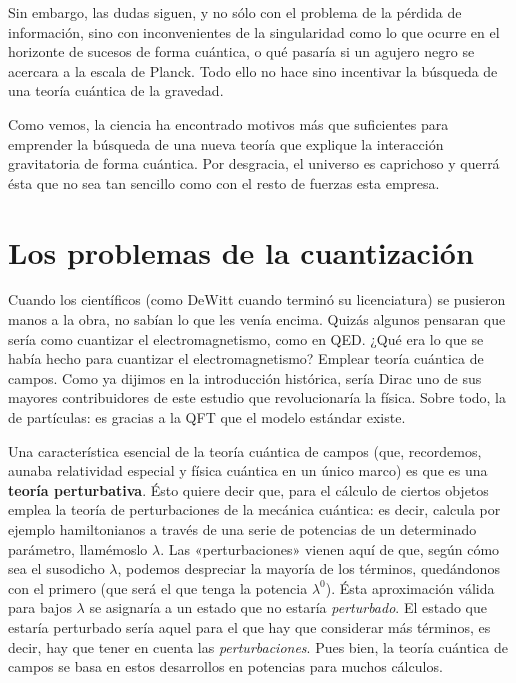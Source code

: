 \documentclass[11pt,a4paper,titlepage]{article}
\begin{document}
\begin{description}
{  Sin embargo, las dudas siguen, y no sólo con el problema de la pérdida de información, sino con inconvenientes de la singularidad como lo que ocurre en el horizonte de sucesos de forma cuántica, o qué pasaría si un agujero negro se acercara a la escala de Planck. Todo ello no hace sino incentivar la búsqueda de una teoría cuántica de la gravedad.}

\end{description}

Como vemos, la ciencia ha encontrado motivos más que suficientes para emprender la búsqueda de una nueva teoría que explique la interacción gravitatoria de forma cuántica. Por desgracia, el universo es caprichoso y querrá ésta que no sea tan sencillo como con el resto de fuerzas esta empresa.
%
%
%
%
\newpage
\section{Los problemas de la cuantización}
Cuando los científicos (como DeWitt cuando terminó su licenciatura) se pusieron manos a la obra, no sabían lo que les venía encima. Quizás algunos pensaran que sería como cuantizar el electromagnetismo, como en QED. ¿Qué era lo que se había hecho para cuantizar el electromagnetismo? Emplear teoría cuántica de campos. Como ya dijimos en la introducción histórica, sería Dirac uno de sus mayores contribuidores de este estudio que revolucionaría la física. Sobre todo, la de partículas: es gracias a la QFT que el modelo estándar existe.

Una característica esencial de la teoría cuántica de campos (que, recordemos, aunaba relatividad especial y física cuántica en un único marco) es que es una \textbf{teoría perturbativa}. Ésto quiere decir que, para el cálculo de ciertos objetos emplea la teoría de perturbaciones de la mecánica cuántica: es decir, calcula por ejemplo hamiltonianos a través de una serie de potencias de un determinado parámetro, llamémoslo $\lambda$. Las «perturbaciones» vienen aquí de que, según cómo sea el susodicho $\lambda$, podemos despreciar la mayoría de los términos, quedándonos con el primero (que será el que tenga la potencia $\lambda^0$). Ésta aproximación válida para bajos $\lambda$ se asignaría a un estado que no estaría \textit{perturbado}. El estado que estaría perturbado sería aquel para el que hay que considerar más términos, es decir, hay que tener en cuenta las \textit{perturbaciones}. Pues bien, la teoría cuántica de campos se basa en estos desarrollos en potencias para muchos cálculos.
\end{document}
